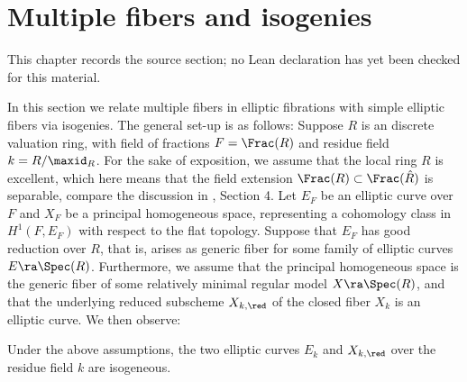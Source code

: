 \chapter{Multiple fibers and isogenies}
\label{no-enriques-surface-over-the-integers-chapter-09}

\begin{remark}
\label{no-enriques-surface-over-the-integers-chapter-09-source}
This chapter records the source section; no Lean declaration has yet been checked for this material.
\notready
\end{remark}

\label{Multiple fibers}

In this section we relate  multiple   fibers in elliptic fibrations with simple elliptic fibers
via isogenies. The general  set-up is as follows: Suppose $R$ is an   discrete valuation ring,
with field of fractions $F=\Frac(R)$ and residue field $k=R/\maxid_R$. For the sake of exposition,
we assume that  the local ring $R$ is excellent, which here means that the field extension $\Frac(R)\subset\Frac(\hat{R})$
is separable, compare the discussion in \cite{Schroeer-2020}, Section 4.
Let $E_F$ be an elliptic curve over $F$ and $X_F$ be a principal homogeneous space,
representing a cohomology class in $H^1(F,E_F)$ with respect to the   flat topology.
Suppose that $E_F$ has good reduction over $R$, that is,   arises as generic fiber for some
family of elliptic curves $E\ra\Spec(R)$.
Furthermore, we assume that the principal homogeneous space is the generic fiber of some relatively minimal regular model
$X\ra\Spec(R)$, and that the underlying reduced subscheme $X_{k,\red}$  of the closed
fiber $X_k$ is an elliptic curve. We then observe:

\begin{proposition}
\notready
\label{reduction isogeneous}
Under the above assumptions, the two elliptic curves $E_k$ and $X_{k,\red}$ over the residue field $k$ are isogeneous.
\end{proposition}

